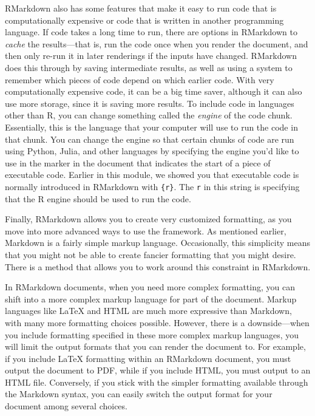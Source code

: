 \documentclass[]{tufte-book}
\begin{document}
RMarkdown also has some features that make it easy to run code that is
computationally expensive or code that is written in another programming
language. If code takes a long time to run, there are options in RMarkdown to
\emph{cache} the results---that is, run the code once when you render the document,
and then only re-run it in later renderings if the inputs have changed. RMarkdown
does this through by saving intermediate results, as well as using a system to
remember which pieces of code depend on which earlier code. With very computationally
expensive code, it can be a big time saver, although it can also use more storage,
since it is saving more results. To include code in languages other than R, you can
change something called the \emph{engine} of the code chunk. Essentially, this is the
language that your computer will use to run the code in that chunk. You can change
the engine so that certain chunks of code are run using Python, Julia, and other
languages by specifying the engine you'd like to use in the marker in the document
that indicates the start of a piece of executable code. Earlier in this module,
we showed you that executable code is normally introduced in RMarkdown with
\texttt{\textasciigrave{}\textasciigrave{}\textasciigrave{}\{r\}}. The \texttt{r} in this string is specifying that the R engine should be
used to run the code.

Finally, RMarkdown allows you to create very customized formatting, as you move into
more advanced ways to use the framework.
As mentioned earlier, Markdown is a fairly simple markup language. Occasionally,
this simplicity means that you might not be able to create fancier formatting
that you might desire. There is a method that allows you to work around this
constraint in RMarkdown.

In RMarkdown documents, when you need more complex formatting, you can shift
into a more complex markup language for part of the document. Markup languages
like LaTeX and HTML are much more expressive than Markdown, with many more
formatting choices possible. However,
there is a downside---when you include formatting specified in these
more complex markup languages, you will limit the output formats that you can
render the document to. For example, if you include LaTeX formatting within
an RMarkdown document, you must output the document to PDF, while if you
include HTML, you must output to an HTML file. Conversely, if you stick with
the simpler formatting available through the Markdown syntax, you can easily
switch the output format for your document among several choices.
\end{document}
